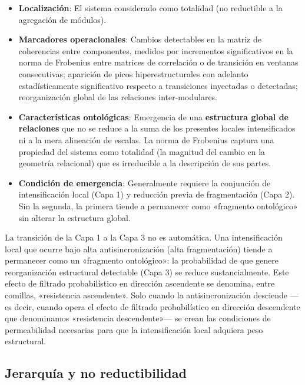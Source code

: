\begin{itemize}
    \item \textbf{Localización}: El sistema considerado como totalidad (no reductible a la agregación de módulos).
    \item \textbf{Marcadores operacionales}: Cambios detectables en la matriz de coherencias entre componentes, medidos por incrementos significativos en la norma de Frobenius entre matrices de correlación o de transición en ventanas consecutivas; aparición de picos hiperestructurales con adelanto estadísticamente significativo respecto a transiciones inyectadas o detectadas; reorganización global de las relaciones inter-modulares.
    \item \textbf{Características ontológicas}: Emergencia de una \textbf{estructura global de relaciones} que no se reduce a la suma de los presentes locales intensificados ni a la mera alineación de escalas. La norma de Frobenius captura una propiedad del sistema como totalidad (la magnitud del cambio en la geometría relacional) que es irreducible a la descripción de sus partes.
    \item \textbf{Condición de emergencia}: Generalmente requiere la conjunción de intensificación local (Capa 1) y reducción previa de fragmentación (Capa 2). Sin la segunda, la primera tiende a permanecer como «fragmento ontológico» sin alterar la estructura global.
\end{itemize}

\begin{importantbox}
La transición de la Capa 1 a la Capa 3 no es automática. Una intensificación local que ocurre bajo alta antisincronización (alta fragmentación) tiende a permanecer como un «fragmento ontológico»: la probabilidad de que genere reorganización estructural detectable (Capa 3) se reduce sustancialmente. Este efecto de filtrado probabilístico en dirección ascendente se denomina, entre comillas, «resistencia ascendente». Solo cuando la antisincronización desciende —es decir, cuando opera el efecto de filtrado probabilístico en dirección descendente que denominamos «resistencia descendente»— se crean las condiciones de permeabilidad necesarias para que la intensificación local adquiera peso estructural.
\end{importantbox}

\subsection{Jerarquía y no reductibilidad}

